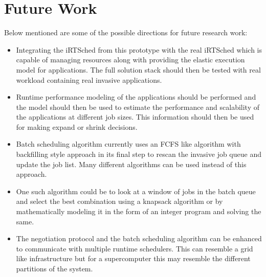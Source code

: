 \section{Future Work}
Below mentioned are some of the possible directions for future research work:
\begin{itemize}
\item Integrating the iRTSched from this prototype with the real iRTSched which is capable of managing resources along with providing the elastic execution model for applications. The full solution stack should then be tested with real workload containing real invasive applications.
\item Runtime performance modeling of the applications should be performed and the model should then be used to estimate the performance and scalability of the applications at different job sizes. This information should then be used for making expand or shrink decisions.
\item Batch scheduling algorithm currently uses an FCFS like algorithm with backfilling style approach in its final step to rescan the invasive job queue and update the job list. Many different algorithms can be used instead of this approach.
\item One such algorithm could be to look at a window of jobs in the batch queue and select the best combination using a knapsack algorithm or by mathematically modeling it in the form of an integer program and solving the same.
\item The negotiation protocol and the batch scheduling algorithm can be enhanced to communicate with multiple runtime schedulers. This can resemble a grid like infrastructure but for a supercomputer this may resemble the different partitions of the system.
\end{itemize}

